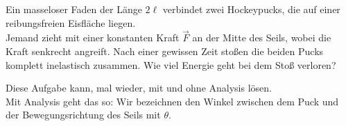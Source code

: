 \begin{minipage}[b]{0.8\textwidth}
\begin{Exercise}[title = Zwei Pucks, origin = {Morin - Classical Mechanics}, difficulty = 3, label = pucks]
Ein masseloser Faden der Länge $2\ell$ verbindet zwei Hockeypucks, die auf einer reibungsfreien Eisfläche liegen.\\
Jemand zieht mit einer konstanten Kraft $\vec{F}$ an der Mitte des Seils, wobei die Kraft senkrecht angreift.
Nach einer gewissen Zeit stoßen die beiden Pucks komplett inelastisch zusammen. Wie viel Energie geht bei dem Stoß verloren?
\end{Exercise}
\end{minipage}
\hfill
\begin{minipage}[b]{.2\textwidth}
\centering
{}
\end{minipage}
\begin{Answer}[ref = pucks]
	Diese Aufgabe kann, mal wieder, mit und ohne Analysis lösen.\\
	Mit Analysis geht das so: Wir bezeichnen den Winkel zwischen dem Puck und der Bewegungsrichtung des Seils mit $\theta$.\\
\end{Answer}